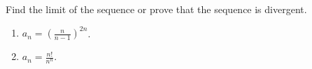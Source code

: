 Find the limit of the sequence or prove that the sequence is divergent.
\begin{enumerate}
\item $a_n=\left(\frac{n}{n-1}\right)^{2n}$.
\item $a_n=\frac{n!}{n^n}$.
\end{enumerate}
